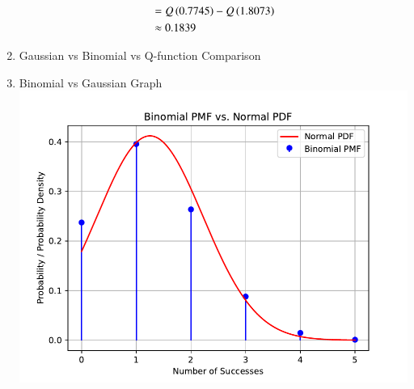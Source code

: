 \documentclass[journal,12pt,twocolumn]{IEEEtran}
\theoremstyle{remark}
\begin{document}
\begin{enumerate}[label=(\roman*)]
\begin{align}
	&=Q\left(0.7745\right)-Q\left(1.8073\right)\\
	&\approx 0.1839
	\end{align}
\item Gaussian vs Binomial vs Q-function Comparison
\begin{table}[!ht]

\end{table}
\item Binomial vs Gaussian Graph\\
\includegraphics[width=\columnwidth]{ncert/9/3/8/figs/plot.pdf}
\end{enumerate}
\end{document}
